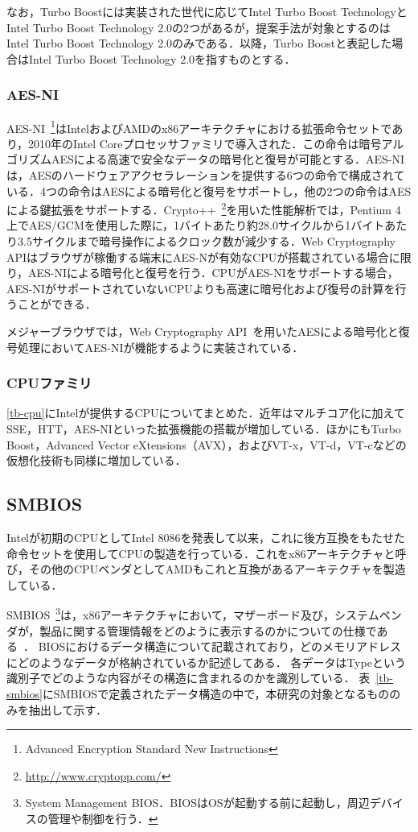 なお，Turbo Boostには実装された世代に応じてIntel Turbo Boost TechnologyとIntel Turbo Boost Technology 2.0の2つがあるが，提案手法が対象とするのはIntel Turbo Boost Technology 2.0のみである．以降，Turbo Boostと表記した場合はIntel Turbo Boost Technology 2.0を指すものとする．
\subsubsection{AES-NI}
AES-NI~\footnote{Advanced Encryption Standard New Instructions}はIntelおよびAMDのx86アーキテクチャにおける拡張命令セットであり，2010年のIntel Coreプロセッサファミリで導入された．この命令は暗号アルゴリズムAESによる高速で安全なデータの暗号化と復号が可能とする．AES-NIは，AESのハードウェアアクセラレーションを提供する6つの命令で構成されている．4つの命令はAESによる暗号化と復号をサポートし，他の2つの命令はAESによる鍵拡張をサポートする．Crypto++~\footnote{\url{http://www.cryptopp.com/}}を用いた性能解析では，Pentium 4上でAES/GCMを使用した際に，1バイトあたり約28.0サイクルから1バイトあたり3.5サイクルまで暗号操作によるクロック数が減少する．Web Cryptography APIはブラウザが稼働する端末にAES-Nが有効なCPUが搭載されている場合に限り，AES-NIによる暗号化と復号を行う．CPUがAES-NIをサポートする場合，AES-NIがサポートされていないCPUよりも高速に暗号化および復号の計算を行うことができる．

メジャーブラウザでは，Web Cryptography API~\cite{web_crypto}を用いたAESによる暗号化と復号処理においてAES-NIが機能するように実装されている．
\subsubsection{CPUファミリ}
\ref{tb-cpu}にIntelが提供するCPUについてまとめた．近年はマルチコア化に加えてSSE，HTT，AES-NIといった拡張機能の搭載が増加している．ほかにもTurbo Boost，Advanced Vector eXtensions（AVX），およびVT-x，VT-d，VT-cなどの仮想化技術も同様に増加している．
\subsection{SMBIOS}
Intelが初期のCPUとしてIntel 8086を発表して以来，これに後方互換をもたせた命令セットを使用してCPUの製造を行っている．これをx86アーキテクチャと呼び，その他のCPUベンダとしてAMDもこれと互換があるアーキテクチャを製造している．

SMBIOS~\footnote{System Management BIOS．BIOSはOSが起動する前に起動し，周辺デバイスの管理や制御を行う．}は，x86アーキテクチャにおいて，マザーボード及び，システムベンダが，製品に関する管理情報をどのように表示するのかについての仕様である~\cite{smbios_spec}．
BIOSにおけるデータ構造について記載されており，どのメモリアドレスにどのようなデータが格納されているか記述してある．
各データはTypeという識別子でどのような内容がその構造に含まれるのかを識別している．
表~\ref{tb-smbios}にSMBIOSで定義されたデータ構造の中で，本研究の対象となるもののみを抽出して示す．


